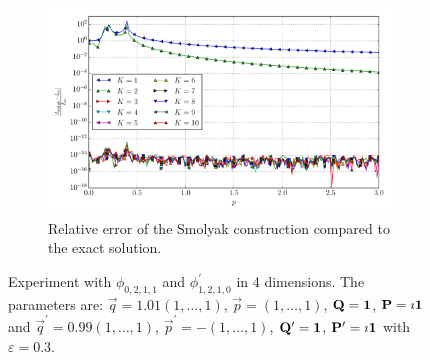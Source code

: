 \documentclass[a4paper,10pt]{article}
\begin{document}
\begin{figure}[ht!]
\begin{subfigure}[t]{0.5\linewidth}
    \includegraphics[width=\linewidth]{./plots/tp_sg_4d_conv_p_(0,2,1,1)_(1,2,1,0)_err_rel_nsd_gk.pdf}
    \caption{Relative error of the Smolyak construction compared to the exact solution.}
    \label{fig:tp_sg_4d_conv_p_0211_1210_err_rel_nsd_gk}
  \end{subfigure}
  \label{fig:tp_sg_4d_conv_p_0211_1210}
  \caption{Experiment with $\phi_{0,2,1,1}$ and $\phi_{1,2,1,0}^{\prime}$
  in 4 dimensions.
  The parameters are:
  $\vec{q} = 1.01 (1,\ldots,1)$,
  $\vec{p} = (1,\ldots,1)$,
  $\mathbf{Q} = \mathbf{1}$,
  $\mathbf{P} = \imath \mathbf{1}$
  and
  $\vec{q}^\prime = 0.99 (1,\ldots,1)$,
  $\vec{p}^\prime = -(1,\ldots,1)$,
  $\mathbf{Q}^\prime = \mathbf{1}$,
  $\mathbf{P}^\prime = \imath \mathbf{1}$
  with $\varepsilon=0.3$.}
\end{figure}
\end{document}
